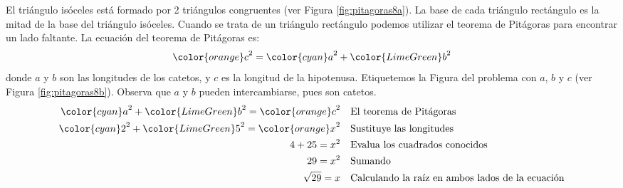 \begin{solutionbox}{14cm}
\begin{minipage}{0.3\textwidth}
\begin{figure}[H]
        \end{figure}
    \end{minipage}\hfill
    \begin{minipage}{0.65\textwidth}
        El triángulo isóceles está formado por 2 triángulos congruentes (ver Figura \ref{fig:pitagoras8a}).
        La base de cada triángulo rectángulo es la mitad de la base del triángulo isóceles.
        Cuando se trata de un triángulo rectángulo podemos utilizar el teorema de Pitágoras para encontrar un lado faltante.
        La ecuación del teorema de Pitágoras es:
        \[{\color{orange}c}^2={\color{cyan}a}^2+{\color{LimeGreen}b}^2\]
        donde $a$ y $b$ son las longitudes de los catetos, y $c$ es la longitud de la hipotenusa.
        Etiquetemos la Figura del problema con $a$, $b$ y $c$ (ver Figura \ref{fig:pitagoras8b}).
        Observa que $a$ y $b$ pueden intercambiarse, pues son catetos.
        \begin{align*}
            {\color{cyan}a}^2+{\color{LimeGreen}b}^2  ={\color{orange}c}^2 & \text{\quad El teorema de Pitágoras}                          \\
            {\color{cyan}2}^2+{\color{LimeGreen}5}^2  ={\color{orange}x}^2 & \text{\quad Sustituye las longitudes}                         \\
            4+25  =x^2                                                     & \text{\quad Evalua los cuadrados conocidos}                   \\
            29=x^2                                                         & \text{\quad Sumando }                                         \\
            \sqrt{29}=x                                                    & \text{\quad Calculando la raíz en ambos lados de la ecuación} \\
        \end{align*}
    \end{minipage}
\end{solutionbox}
